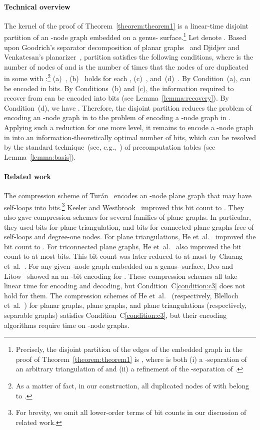 \documentclass[12pt]{article}
\begin{document}
\paragraph{Technical overview}
The kernel of the proof of Theorem~\ref{theorem:theorem1} is a
linear-time disjoint partition  of an -node graph
 embedded on a genus-
surface.\footnote{Precisely, the disjoint partition 
  of the edges of the embedded graph  in the proof of
  Theorem~\ref{theorem:theorem1} is ,
  where  is both (i) a -separation  of an
  arbitrary triangulation  of  and (ii) a refinement of the
  -separation  of .}  Let
 denote .  Based upon Goodrich's
separator decomposition of planar graphs~\cite{Goodrich95} and Djidjev
and Venkatesan's planarizer~\cite{DjidjevV95}, partition
 satisfies the following conditions, where  is
the number of nodes of  and  is the number of times that the
nodes of  are duplicated in some  with :\footnote{As
  a matter of fact, in our construction, all duplicated nodes of 
  with  belong to .}  (a)~,
(b)~ holds for each ,
(c)~, and~(d)~.  By Condition~(a),  can be encoded in
 bits. By Conditions~(b) and (c), the information required to
recover  from  can be encoded into  bits
(see Lemma~\ref{lemma:recovery}).  By Condition~(d), we have
.  Therefore, the disjoint partition reduces
the problem of encoding an -node graph in  to the problem of
encoding a -node graph in .  Applying such a
reduction for one more level, it remains to encode a
-node graph in  into an
information-theoretically optimal number of bits, which can be
resolved by the standard technique~(see,
e.g.,~\cite{HeKL00,MunroR01,PettieR02}) of precomputation tables (see
Lemma~\ref{lemma:basis}).

\paragraph{Related work}
The compression scheme of Tur\'{a}n~\cite{turan84} encodes an -node
plane graph that may have self-loops into  bits.\footnote{For
  brevity, we omit all lower-order terms of bit counts in our
  discussion of related work.}  Keeler and Westbrook~\cite{KeelerW95}
improved this bit count to .  They also gave compression
schemes for several families of plane graphs. In particular, they used
 bits for plane triangulation, and  bits for connected
plane graphs free of self-loops and degree-one nodes.  For plane
triangulations, He et~al.~\cite{HeKL99} improved the bit count to
.  For triconnected plane graphs, He et~al.~\cite{HeKL99} also
improved the bit count to at most  bits.  This bit count was
later reduced to at most  by
Chuang et~al.~\cite{ChuangGHKL98}.  For any given -node graph 
embedded on a genus- surface, Deo and Litow~\cite{DeoL98} showed an
an -bit
encoding for . These compression schemes all take linear time for
encoding and decoding, but Condition~C\ref{condition:c3} does not hold
for them.  The compression schemes of He et~al.~\cite{HeKL00}
(respectively, Blelloch et~al.~\cite{BlellochF10}) for planar graphs,
plane graphs, and plane triangulations (respectively, separable
graphs) satisfies Condition~C\ref{condition:c3}, but their encoding
algorithms require  time on -node graphs.
\end{document}
